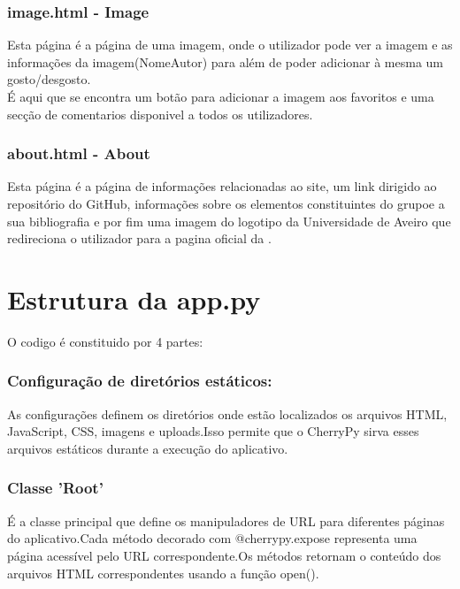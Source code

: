 \documentclass{report}
\begin{document}
\subsubsection{image.html - Image}

\indent Esta página é a página de uma imagem, onde o utilizador pode ver a imagem  e as informações da imagem(NomeAutor) para além de poder adicionar à mesma um gosto/desgosto.\\
\indent É aqui que se encontra um botão para adicionar a imagem aos favoritos e uma secção de comentarios disponivel a todos os utilizadores.\\

\subsubsection{about.html - About}

\indent Esta página é a página de informações relacionadas ao site, um link dirigido ao repositório do GitHub, informações sobre os elementos constituintes do grupoe a sua bibliografia e por fim uma imagem do logotipo da Universidade de Aveiro que redireciona o utilizador para a pagina oficial da .\\

\section {Estrutura da app.py}

\indent O codigo é constituido por 4 partes:

\subsubsection{Configuração de diretórios estáticos:}

\indent As configurações definem os diretórios onde estão localizados os arquivos HTML, JavaScript, CSS, imagens e uploads.Isso permite que o CherryPy sirva esses arquivos estáticos durante a execução do aplicativo.\\

\subsubsection{Classe 'Root'}

\indent É a classe principal que define os manipuladores de URL para diferentes páginas do aplicativo.Cada método decorado com @cherrypy.expose representa uma página acessível pelo URL correspondente.Os métodos retornam o conteúdo dos arquivos HTML correspondentes usando a função open().\\
\end{document}
